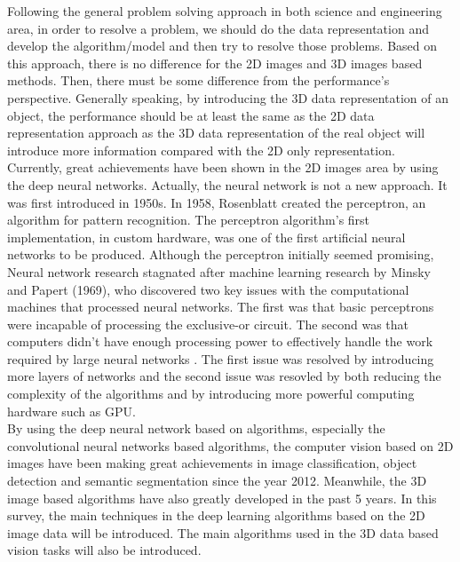 \documentclass[a4paper,12pt]{article}
\begin{document}
Following the general problem solving approach in both science and engineering area, in order to resolve a problem, we should do the data representation and develop the algorithm/model and then try to resolve those problems. Based on this approach, there is no difference for the 2D images and 3D images based methods. Then, there must be some difference from the performance's perspective. Generally speaking, by introducing the 3D data representation of an object, the performance should be at least the same as the 2D data representation approach as the 3D data representation of the real object will introduce more information compared with the 2D only representation.\\
Currently, great achievements have been shown in the 2D images area by using the deep neural networks. Actually, the neural network is not a new approach. It was first introduced in 1950s. In 1958, Rosenblatt\cite{Rosenblatt} created the perceptron, an algorithm for pattern recognition.  The perceptron algorithm's first implementation, in custom hardware, was one of the first artificial neural networks to be produced. Although the perceptron initially seemed promising, Neural network research stagnated after machine learning research by Minsky and Papert (1969)\cite{Minsky}, who discovered two key issues with the computational machines that processed neural networks. The first was that basic perceptrons were incapable of processing the exclusive-or circuit. The second was that computers didn't have enough processing power to effectively handle the work required by large neural networks
\cite{ann}. The first issue was resolved by introducing more layers of networks and the second issue was resovled by both reducing the complexity of the algorithms and by introducing more powerful computing hardware such as GPU.\\
By using the deep neural network based on algorithms, especially the convolutional neural networks based algorithms, the computer vision based on 2D images have been making great achievements in image classification, object detection and semantic segmentation since the year 2012. Meanwhile, the 3D image based algorithms have also greatly developed in the past 5 years. In this survey, the main techniques in the deep learning algorithms based on the 2D image data will be introduced. The main algorithms used in the 3D data based vision tasks will also be introduced. \\
\end{document}

